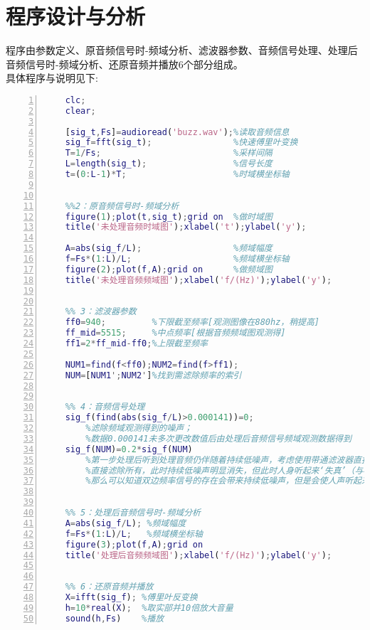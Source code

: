 \section{程序设计与分析}
\indent 程序由参数定义、原音频信号时-频域分析、滤波器参数、音频信号处理、处理后音频信号时-频域分析、还原音频并播放6个部分组成。\\
\indent 具体程序与说明见下:\\
\setmonofont{Consolas}
\begin{lstlisting}[language = matlab, numbers=left,  numberstyle=\tiny,keywordstyle=\color{blue!70},rulesepcolor=\color{red!20!green!20!blue!20},basicstyle=\ttfamily,breaklines=true,  frame=shadowbox,commentstyle=\color{red!30!green!40!blue!70}\textit,keywordstyle=\color{blue!90}\bfseries]
    %%1：参数定义
    clc;
    clear;

    [sig_t,Fs]=audioread('buzz.wav');%读取音频信息
    sig_f=fft(sig_t);                %快速傅里叶变换
    T=1/Fs;                          %采样间隔
    L=length(sig_t);                 %信号长度
    t=(0:L-1)*T;                     %时域横坐标轴


    %%2：原音频信号时-频域分析
    figure(1);plot(t,sig_t);grid on  %做时域图
    title('未处理音频时域图');xlabel('t');ylabel('y');
    
    A=abs(sig_f/L);                  %频域幅度
    f=Fs*(1:L)/L;                    %频域横坐标轴
    figure(2);plot(f,A);grid on      %做频域图
    title('未处理音频频域图');xlabel('f/(Hz)');ylabel('y');


    %% 3：滤波器参数
    ff0=940;         %下限截至频率[观测图像在880hz，稍提高]
    ff_mid=5515;     %中点频率[根据音频频域图观测得]
    ff1=2*ff_mid-ff0;%上限截至频率
    
    NUM1=find(f<ff0);NUM2=find(f>ff1);
    NUM=[NUM1';NUM2']%找到需滤除频率的索引
    

    %% 4：音频信号处理
    sig_f(find(abs(sig_f/L)>0.000141))=0;
        %滤除频域观测得到的噪声；
        %数据0.000141未多次更改数值后由处理后音频信号频域观测数据得到
    sig_f(NUM)=0.2*sig_f(NUM)
        %第一步处理后听到处理音频仍伴随着持续低噪声，考虑使用带通滤波器直接去除双边频域信号；
        %直接滤除所有，此时持续低噪声明显消失，但此时人身听起来‘失真’（与初步处理音频相比更不像真人说话的效果）；
        %那么可以知道双边频率信号的存在会带来持续低噪声，但是会使人声听起来‘更饱和’，于是考虑对该信号进行幅度调整而非直接滤除。经过多次尝试，将幅度调整0.2倍时，可以保持人声的‘饱和’同时消减持续低噪声。此时，可使得去噪效果呈现最佳状态。


    %% 5：处理后音频信号时-频域分析
    A=abs(sig_f/L); %频域幅度
    f=Fs*(1:L)/L;   %频域横坐标轴
    figure(3);plot(f,A);grid on
    title('处理后音频频域图');xlabel('f/(Hz)');ylabel('y'); 

    
    %% 6：还原音频并播放
    X=ifft(sig_f); %傅里叶反变换
    h=10*real(X);  %取实部并10倍放大音量
    sound(h,Fs)    %播放
\end{lstlisting}   
    
